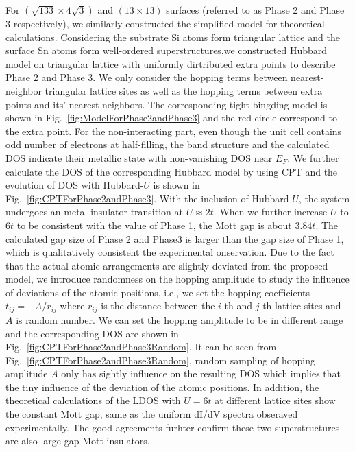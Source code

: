 \documentclass[aps,prb,reprint,amsfonts,amsmath,amssymb,showpacs,groupedaddress,superscriptaddress,onecolumn]{revtex4-1}
\begin{document}
For $(\sqrt{133} \times 4\sqrt{3})$ and $(13 \times 13)$ surfaces (referred to as Phase 2 and Phase 3 respectively), we similarly constructed the simplified model for theoretical calculations. Considering the substrate Si atoms form triangular lattice and the surface Sn atoms form well-ordered superstructures,we constructed Hubbard model on triangular lattice with uniformly dirtributed extra points to describe Phase 2 and Phase 3. We only consider the hopping terms between nearest-neighbor triangular lattice sites as well as the hopping terms between extra points and its' nearest neighbors. The corresponding tight-bingding model is shown in Fig.~\ref{fig:ModelForPhase2andPhase3} and the red circle correspond to the extra point. For the non-interacting part, even though the unit cell contains odd number of electrons at half-filling, the band structure and the calculated DOS indicate their metallic state with non-vanishing DOS near $E_{F}$. We further calculate the DOS of the corresponding Hubbard model by using CPT and the evolution of DOS with Hubbard-$U$ is shown in Fig.~\ref{fig:CPTForPhase2andPhase3}. With the inclusion of Hubbard-$U$, the system undergoes an metal-insulator transition at $U \approx 2t$. When we further increase $U$ to $6t$ to be consistent with the value of Phase 1, the Mott gap is about $3.84t$. The calculated gap size of
Phase 2 and Phase3 is larger than the gap size of Phase 1, which is qualitatively consistent the experimental onservation. Due to the fact that the actual atomic arrangements are slightly deviated from the proposed model, we introduce randomness on the hopping amplitude to study the influence of deviations of the atomic positions, i.e., we set the hopping coefficients $t_{ij} = -A / r_{ij}$ where $r_{ij}$ is the distance between the $i$-th and $j$-th lattice sites and $A$ is random number. We can set the hopping amplitude to be in different range and the corresponding DOS are shown in Fig.~\ref{fig:CPTForPhase2andPhase3Random}. It can be seen from Fig.~\ref{fig:CPTForPhase2andPhase3Random}, random sampling of hopping amplitude $A$ only has sightly influence on the resulting DOS which implies that the tiny influence of the deviation of the atomic positions. In addition, the theoretical calculations of the LDOS with $U = 6t$ at different lattice sites show the constant Mott gap, same as the uniform dI/dV spectra obseraved experimentally. The good agreements furhter confirm these two superstructures are also large-gap Mott insulators.
\end{document}
